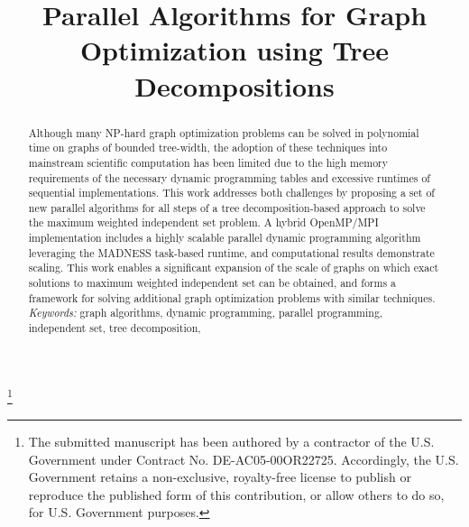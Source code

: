 \documentclass[conference]{IEEEtran}
\begin{document}
\title{Parallel Algorithms for Graph Optimization using Tree Decompositions}
\author{
\and
{}
\and
{}
}
\maketitle
\footnote{The submitted manuscript has been authored by a contractor of the U.S. Government under
Contract No. DE-AC05-00OR22725. Accordingly, the U.S. Government retains a non-exclusive,
royalty-free license to publish or reproduce the published form of this contribution, or
allow others to do so, for U.S. Government purposes.}
\begin{abstract}
Although many NP-hard graph optimization problems can be solved in
polynomial time on graphs of bounded tree-width, the adoption of these
techniques into mainstream scientific computation has been limited due
to the high memory requirements of the necessary dynamic programming tables
and excessive runtimes of sequential implementations.  This work
addresses both challenges by proposing a set of new parallel
algorithms for all steps of a tree decomposition-based approach to
solve the maximum weighted independent set problem.  A hybrid OpenMP/MPI
implementation includes a highly scalable parallel dynamic programming
algorithm leveraging the MADNESS task-based runtime, and computational
results demonstrate scaling. This work enables a significant expansion
of the scale of graphs on which exact solutions to maximum weighted
independent set can be obtained, and forms a framework for solving
additional graph optimization problems with similar techniques.
\\
\emph{Keywords:} {graph algorithms, dynamic programming, parallel programming,
  independent set, tree decomposition, }
\end{abstract}
\IEEEpeerreviewmaketitle
\end{document}
